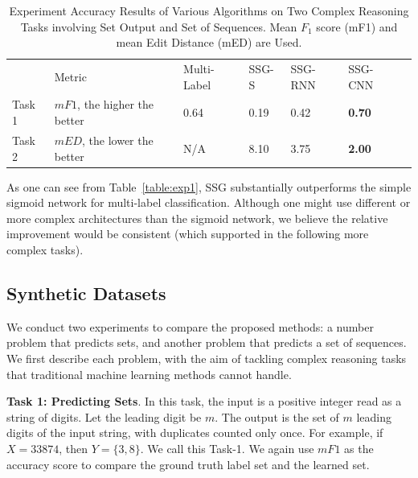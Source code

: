 \documentclass[letterpaper]{article}
\begin{document}
\begin{table}[!htbp]
\centering
\caption{Experiment Accuracy Results of Various Algorithms on Two Complex Reasoning Tasks involving Set Output and Set of Sequences. \newline Mean $F_1$ score (mF1) and mean Edit Distance (mED) are Used. }
\label{table:res}
\begin{adjustbox}{width=1.25\columnwidth}
\begin{tabular}{|l||l||l| l|l|l|l}
\cline{1-6}
  \rule{0pt}{4ex}       &Metric & Multi-Label & SSG-S & SSG-RNN & SSG-CNN &  \\ \cline{1-6}
\rule{0pt}{2ex}    Task 1 & $mF1$, the higher the better & 0.64 &  0.19   &    0.42     &    {\bf  0.70}   &  \\
 \cline{1-6}
\rule{0pt}{2ex}    Task 2 & $mED$, the lower the better & N/A & 8.10     &  3.75      &   {\bf  2.00}     &  \\ \cline{1-6}
\end{tabular}
\end{adjustbox}
\end{table}


As one can see from Table~\ref{table:exp1}, SSG  substantially outperforms the simple sigmoid network for multi-label classification. Although one might use different or more complex architectures than the sigmoid network, we believe the relative improvement would be consistent (which supported in the following more complex tasks).

\subsection{Synthetic Datasets}
We conduct two experiments to compare the proposed methods: a number problem that predicts sets, and another problem that predicts a set of sequences. We first describe each problem, with the aim of tackling complex reasoning tasks that traditional machine learning methods cannot handle.

\noindent\textbf{Task 1: Predicting Sets}.
In this task, the input is a positive integer read as a string of digits. Let the leading digit be $m$. The output is the set of $m$ leading digits of the input string, with duplicates counted only once. For example, if $X=33874$, then $Y=\{3,8\}$. We call this Task-1. We again use $mF1$ as the accuracy score to compare the ground truth label set and the learned set.
\end{document}
